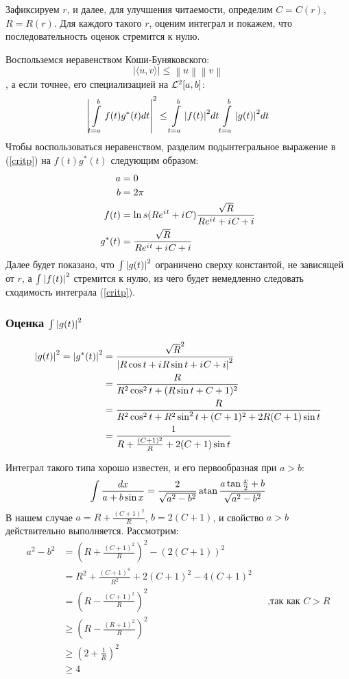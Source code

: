 
Зафиксируем $r$, и далее, для улучшения читаемости, определим $C = C(r)$, $R = R(r)$. Для каждого такого $r$, оценим интеграл и покажем, что последовательность оценок стремится к нулю.

Воспольземся неравенством Коши-Буняковского:
\[
\big| \langle u,v \rangle \big| \leq \left\|u\right\| \left\|v\right\|
\]
, а если точнее, его специализацией на $\mathcal{L}^2[a, b]$:
\[
\abs{
\int\limits_{t=a}^{b} f(t) g^*(t) dt
}^2
\le
\int\limits_{t=a}^b \abs{f(t)}^2 dt 
\int\limits_{t=a}^b \abs{g(t)}^2 dt 
\]
% 
Чтобы воспользоваться неравенством, разделим подынтегральное выражение в  (\ref{critp}) на $f(t) g^*(t)$ следующим образом:
\begin{equation*}
\begin{aligned}
a      &= 0 \\
b      &= 2 \pi \\
f(t)   &= \ln s(R e^{{i\mkern1mu} t} + {i\mkern1mu} C) \frac{\sqrt{R}}{R e^{{i\mkern1mu} t} + {i\mkern1mu} C + i} \\
g^*(t) &= \frac{\sqrt{R}}{R e^{{i\mkern1mu} t} + {i\mkern1mu} C + i}
\end{aligned}
\end{equation*}
Далее будет показано, что $\int \abs{g(t)}^2$ ограничено сверху константой, не зависящей от $r$, а $\int \abs{f(t)}^2$ стремится к нулю, из чего будет немедленно следовать сходимость интеграла (\ref{critp}).

\subsubsection{Оценка $\int \abs{g(t)}^2$}

\begin{align*}
\abs{g(t)}^2 = \abs{g^*(t)}^2
&=   \frac{\sqrt{R}^2}{\abs{R \cos t + {i\mkern1mu} R \sin t + {i\mkern1mu} C + i}^2} \\
&=   \frac{R}{R^2 \cos^2 t + (R \sin t + C + 1)^2} \\
&= \frac{R}{R^2 \cos^2 t + R^2 \sin^2 t + (C + 1)^2  + 2 R (C + 1) \sin t} \\
&=   \frac{1}{R + \frac{(C + 1)^2}{R} + 2 (C + 1) \sin t} \\ 
\end{align*}

Интеграл такого типа хорошо известен, и его первообразная при $a > b$:
\[
\int \frac{dx}{a + b \sin x} = \frac{2}{\sqrt{a^2 - b^2}} \atan \frac{a \tan \frac{x}{2} + b}{\sqrt{a^2 - b^2}}
\]
В нашем случае $a = R + \frac{(C + 1)^2}{R}$, $b = 2 (C + 1)$, и свойство $a > b$ действительно выполняется.  Рассмотрим:
\begin{align*}
a^2 - b^2
& =  (R + \frac{(C + 1)^2}{R})^2 - (2 (C + 1))^2\\
& =  R^2 + \frac{(C+1)^4}{R^2} + 2 (C+1)^2 - 4 (C + 1)^2 \\
& =  (R - \frac{(C + 1)^2}{R})^2 && \text{,так как $C > R$} \\
&\ge (R - \frac{(R + 1)^2}{R})^2 \\
&\ge (2 + \frac{1}{R})^2 \\
&\ge 4
\end{align*}

